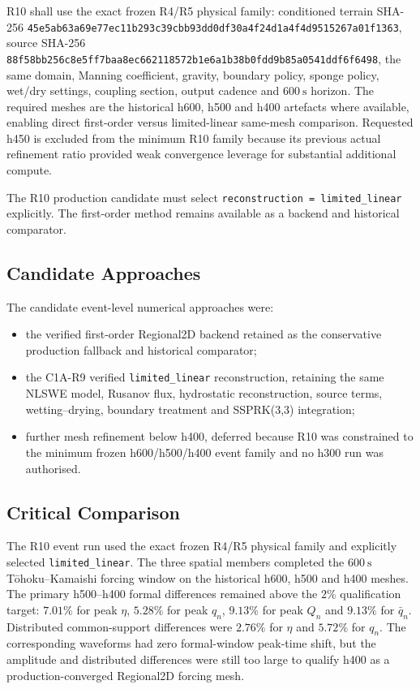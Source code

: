 R10 shall use the exact frozen R4/R5 physical family: conditioned
terrain SHA-256
\texttt{45e5ab63a69e77ec11b293c39cbb93dd0df30a4f24d1a4f4d9515267a01f1363},
source SHA-256
\texttt{88f58bb256c8e5ff7baa8ec662118572b1e6a1b38b0fdd9b85a0541ddf6f6498},
the same domain, Manning coefficient, gravity, boundary policy, sponge
policy, wet/dry settings, coupling section, output cadence and
$600~\mathrm{s}$ horizon. The required meshes are the historical h600,
h500 and h400 artefacts where available, enabling direct first-order
versus limited-linear same-mesh comparison. Requested h450 is excluded
from the minimum R10 family because its previous actual refinement ratio
provided weak convergence leverage for substantial additional compute.

The R10 production candidate must select
\texttt{reconstruction = limited\_linear} explicitly. The first-order
method remains available as a backend and historical comparator.

\subsection{Candidate Approaches}
\label{sec:res-ver-cnv-candidate-approaches}

The candidate event-level numerical approaches were:

\begin{itemize}
  \item the verified first-order Regional2D backend retained as the
    conservative production fallback and historical comparator;
  \item the C1A-R9 verified \texttt{limited\_linear} reconstruction,
    retaining the same NLSWE model, Rusanov flux, hydrostatic
    reconstruction, source terms, wetting--drying, boundary treatment
    and SSPRK(3,3) integration;
  \item further mesh refinement below h400, deferred because R10 was
    constrained to the minimum frozen h600/h500/h400 event family and
    no h300 run was authorised.
\end{itemize}

\subsection{Critical Comparison}
\label{sec:res-ver-cnv-critical-comparison}

The R10 event run used the exact frozen R4/R5 physical family and
explicitly selected \texttt{limited\_linear}. The three spatial members
completed the $600~\mathrm{s}$ Tōhoku--Kamaishi forcing window on the
historical h600, h500 and h400 meshes. The primary h500--h400 formal
differences remained above the $2\%$ qualification target: $7.01\%$ for
peak $\eta$, $5.28\%$ for peak $q_n$, $9.13\%$ for peak $Q_n$ and
$9.13\%$ for $\bar{q}_n$. Distributed common-support differences were
$2.76\%$ for $\eta$ and $5.72\%$ for $q_n$. The corresponding
waveforms had zero formal-window peak-time shift, but the amplitude and
distributed differences were still too large to qualify h400 as a
production-converged Regional2D forcing mesh.

